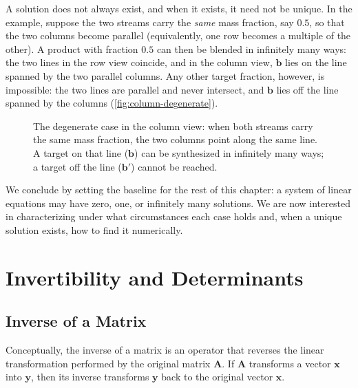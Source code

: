 A solution does not always exist, and when it exists, it need not be unique.
In the example, suppose the two streams carry the \emph{same} mass fraction, say $0.5$, so that the two columns become parallel (equivalently, one row becomes a multiple of the other).
A product with fraction $0.5$ can then be blended in infinitely many ways: the two lines in the row view coincide, and in the column view, $\mathbf{b}$ lies on the line spanned by the two parallel columns.
Any other target fraction, however, is impossible: the two lines are parallel and never intersect, and $\mathbf{b}$ lies off the line spanned by the columns (\autoref{fig:column-degenerate}).

\begin{figure}[H]
    \centering
    \caption{The degenerate case in the column view: when both streams carry the same mass fraction, the two columns point along the same line. A target on that line ($\mathbf{b}$) can be synthesized in infinitely many ways; a target off the line ($\mathbf{b}'$) cannot be reached.}
    \label{fig:column-degenerate}
\end{figure}

We conclude by setting the baseline for the rest of this chapter: a system of linear equations may have zero, one, or infinitely many solutions.
We are now interested in characterizing under what circumstances each case holds and, when a unique solution exists, how to find it numerically.


\section{Invertibility and Determinants}
\subsection{Inverse of a Matrix}
Conceptually, the inverse of a matrix is an operator that reverses the linear transformation performed by the original matrix $ \mathbf{A} $. If $ \mathbf{A} $ transforms a vector $ \mathbf{x} $ into $ \mathbf{y} $, then its inverse transforms $ \mathbf{y} $ back to the original vector $ \mathbf{x} $.

